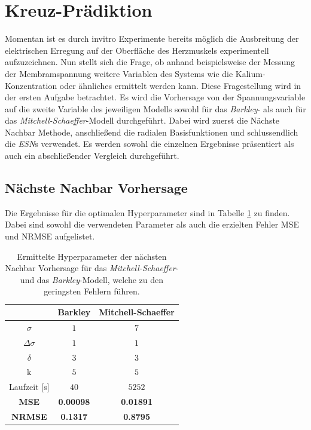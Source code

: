 \section{Kreuz-Prädiktion}
\label{sec:exp_cross_pred}
Momentan ist es durch invitro Experimente bereits möglich die Ausbreitung der elektrischen Erregung auf der Oberfläche des Herzmuskels experimentell aufzuzeichnen. Nun stellt sich die Frage, ob anhand beispielsweise der Messung der Membramspannung weitere Variablen des Systems wie die Kalium-Konzentration oder ähnliches ermittelt werden kann. Diese Fragestellung wird in der ersten Aufgabe betrachtet. Es wird die Vorhersage von der Spannungsvariable auf die zweite Variable des jeweiligen Modells sowohl für das \textit{Barkley}- als auch für das \textit{Mitchell-Schaeffer}-Modell durchgeführt. Dabei wird zuerst die Nächste Nachbar Methode, anschließend die radialen Basisfunktionen und schlussendlich die \textit{ESN}s verwendet. Es werden sowohl die einzelnen Ergebnisse präsentiert als auch ein abschließender Vergleich durchgeführt.
 
\subsection{Nächste Nachbar Vorhersage}
Die Ergebnisse für die optimalen Hyperparameter sind in Tabelle \ref{tab:exp_cross_nn_results} zu finden. Dabei sind sowohl die verwendeten Parameter als auch die erzielten Fehler MSE und NRMSE aufgelistet.
\begin{table}[h]
	\centering

	\begin{tabular}{ccc}
		\hline		
		\multicolumn{1}{c}{} & Barkley & Mitchell-Schaeffer \\ 
		\hline 
		\rule[-1ex]{0pt}{2.5ex} $\sigma$ & $1$ & $7$ \\ 
		\rule[-1ex]{0pt}{2.5ex} $\Delta \sigma$ & $1$ & $1$ \\ 
		\rule[-1ex]{0pt}{2.5ex} $\delta$ & $3$ & $3$ \\ 
		\rule[-1ex]{0pt}{2.5ex} k & $5$ & $5$ \\ 
		\rule[-1ex]{0pt}{2.5ex} Laufzeit [s] & $40$ & $5252$ \\ 
		\rule[-1ex]{0pt}{2.5ex} \textbf{MSE} & \textbf{0.00098} & \textbf{0.01891} \\ 
		\rule[-1ex]{0pt}{2.5ex} \textbf{NRMSE} & \textbf{0.1317} & \textbf{0.8795} \\ 
		\hline 
	\end{tabular} 

	\caption{Ermittelte Hyperparameter der nächsten Nachbar Vorhersage für das \textit{Mitchell-Schaeffer}- und das \textit{Barkley}-Modell, welche zu den geringsten Fehlern führen.}
\label{tab:exp_cross_nn_results}
\end{table} 

